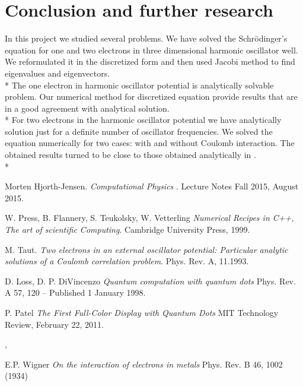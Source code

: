 \documentclass[10pt]{article}
\begin{document}
\newpage
\clearpage
\section{Conclusion and further research}\label{conc}
In this project we studied several problems. We have solved the Schr\"{o}dinger's equation for one and two electrons in three dimensional harmonic oscillator well. We reformulated it in the discretized form and then used Jacobi method to find eigenvalues and eigenvectors.\\*
The one electron in harmonic oscillator potential is analytically solvable problem. Our numerical method for discretized equation provide results that are in a good agreement with analytical solution. \\*
For two electrons in the harmonic oscillator potential we have analytically solution just for a definite number of oscillator frequencies. We solved the equation numerically for two cases: with and without Coulomb interaction. The obtained results turned to be close to those obtained analytically in \cite{three}.  \\*


\clearpage
\newpage
\begin{thebibliography}{2}
Morten Hjorth-Jensen. 
\textit{Computational Physics
}. 
Lecture Notes Fall 2015, August 2015.

W. Press, B. Flannery, S. Teukolsky, W. Vetterling 
\textit{Numerical Recipes in C++, The art of scientific Computing}. 
Cambridge University Press, 1999.

M. Taut. 
\textit{Two electrons in an external oscillator potential: Particular analytic solutions of a Coulomb correlation problem}.
Phys. Rev. A, 11.1993.

D. Loss, D. P. DiVincenzo
\textit{
Quantum computation with quantum dots
}
Phys. Rev. A 57, 120 – Published 1 January 1998.

P. Patel
\textit
{The First Full-Color Display with Quantum Dots
}
MIT Technology Review, February 22, 2011. 

, 

E.P. Wigner
\textit
{On the interaction of electrons in metals
}
Phys. Rev. B 46, 1002 (1934) 


 
\end{thebibliography}
\end{document}
